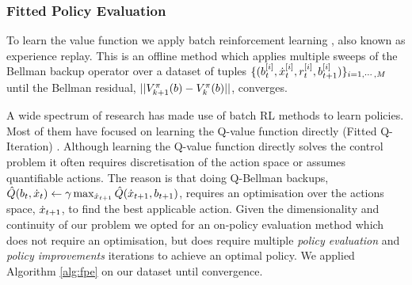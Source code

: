 \subsubsection{Fitted Policy Evaluation}

To learn the value function we apply batch reinforcement learning \cite{EGW05}, also known as experience replay.
This is an offline method which applies multiple sweeps of the Bellman backup operator 
over a dataset of tuples $\{(b^{[i]}_t,\dot{x}^{[i]}_t,r^{[i]}_{t},b^{[i]}_{t+1})\}_{i=1,\cdots,M}$ until the Bellman residual,
$||V^{\pi}_{k+1}(b) - V^{\pi}_{k}(b)||$, converges. 


A wide spectrum of research has made use of batch RL methods to learn policies. 
Most of them have focused on learning the Q-value function directly (Fitted Q-Iteration) 
\cite{NIPS2008_3501,EGW05,Riedmiller05neuralfitted}. Although learning the 
Q-value function directly solves the control problem it often requires discretisation 
of the action space or assumes quantifiable actions. The reason is that doing 
Q-Bellman backups, $\hat{Q}(b_t,\dot{x}_t) \leftarrow \gamma \max_{\dot{x}_{t+1}} \hat{Q}(\dot{x}_{t+1},b_{t+1})$, 
requires an optimisation over the actions space, $\dot{x}_{t+1}$, to find the best applicable action. 
Given the dimensionality and continuity of our problem we opted for an on-policy evaluation method
which does not require an optimisation, but does require multiple 
\textit{policy evaluation} and \textit{policy improvements} iterations to achieve an optimal policy.
We applied Algorithm \ref{alg:fpe} on our dataset until convergence.



